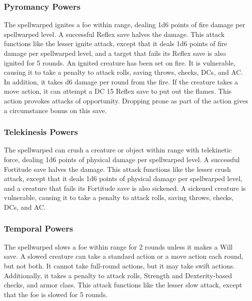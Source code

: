 \subsubsection{Pyromancy Powers}
 The spellwarped ignites a foe within \rngclose range, dealing 1d6 points of fire damage  per spellwarped level. A successful Reflex save halves the damage.
 This attack functions like the lesser ignite attack, except that it deals 1d6 points of fire damage per spellwarped level, and a target that fails its Reflex save is also ignited for 5 rounds. An ignited creature has been set on fire. It is vulnerable, causing it to take a  penalty to attack rolls, saving throws, checks, DCs, and AC. In addition, it takes d6 damage per round from the fire. If the creature takes a move action, it can attempt a DC 15 Reflex save to put out the flames. This action provokes attacks of opportunity. Dropping prone as part of the action gives a  circumstance bonus on this save.

\subsubsection{Telekinesis Powers}
 The spellwarped can crush a creature or object within \rngclose range with telekinetic force, dealing 1d6 points of physical damage  per spellwarped level. A successful Fortitude save halves the damage.
 This attack functions like the lesser crush attack, except that it deals 1d6 points of physical damage per spellwarped level, and a creature that fails its Fortitude save is also sickened. A sickened creature is vulnerable, causing it to take a  penalty to attack rolls, saving throws, checks, DCs, and AC.

\subsubsection{Temporal Powers}
 The spellwarped slows a foe within \rngclose range for 2 rounds unless it makes a Will save. A slowed creature can take a standard action or a move action each round, but not both. It cannot take full-round actions, but it may take swift actions. Additionally, it takes a  penalty to attack rolls, Strength and Dexterity-based checks, and armor class.
 This attack functions like the lesser slow attack, except that the foe is slowed for 5 rounds.

